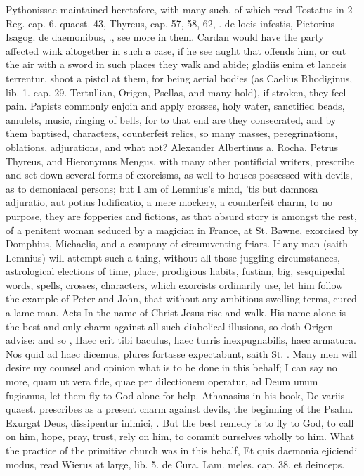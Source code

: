 {Pythonissae maintained heretofore, with many such, of which read
Tostatus in 2 Reg. cap. 6. quaest. 43, Thyreus, cap. 57, 58, 62, \etc{}. de
locis infestis, Pictorius Isagog. de daemonibus, \etc{}., see more in them.
Cardan would have the party affected wink altogether in such a case, if
he see aught that offends him, or cut the air with a sword in such
places they walk and abide; gladiis enim et lanceis terrentur, shoot a
pistol at them, for being aerial bodies (as Caelius Rhodiginus, lib. 1.
cap. 29. Tertullian, Origen, Psellas, and many hold), if stroken, they
feel pain. Papists commonly enjoin and apply crosses, holy water,
sanctified beads, amulets, music, ringing of bells, for to that end are
they consecrated, and by them baptised, characters, counterfeit relics,
so many masses, peregrinations, oblations, adjurations, and what not?
Alexander Albertinus a, Rocha, Petrus Thyreus, and Hieronymus Mengus,
with many other pontificial writers, prescribe and set down several
forms of exorcisms, as well to houses possessed with devils, as to
demoniacal persons; but I am of Lemnius's mind, 'tis but damnosa
adjuratio, aut potius ludificatio, a mere mockery, a counterfeit charm,
to no purpose, they are fopperies and fictions, as that absurd
story is amongst the rest, of a penitent woman seduced by a
magician in France, at St. Bawne, exorcised by Domphius, Michaelis, and
a company of circumventing friars. If any man (saith Lemnius) will
attempt such a thing, without all those juggling circumstances,
astrological elections of time, place, prodigious habits, fustian, big,
sesquipedal words, spells, crosses, characters, which exorcists
ordinarily use, let him follow the example of Peter and John, that
without any ambitious swelling terms, cured a lame man. Acts  In
the name of Christ Jesus rise and walk. His name alone is the best and
only charm against all such diabolical illusions, so doth Origen
advise: and so \Chrysostom{}, Haec erit tibi baculus, haec turris
inexpugnabilis, haec armatura. Nos quid ad haec dicemus, plures
fortasse expectabunt, saith St. \Austin{}. Many men will desire my counsel
and opinion what is to be done in this behalf; I can say no more, quam
ut vera fide, quae per dilectionem operatur, ad Deum unum fugiamus, let
them fly to God alone for help. Athanasius in his book, De variis
quaest. prescribes as a present charm against devils, the beginning of
the  Psalm. Exurgat Deus, dissipentur inimici, \etc{}. But the best
remedy is to fly to God, to call on him, hope, pray, trust, rely on
him, to commit ourselves wholly to him. What the practice of the
primitive church was in this behalf, Et quis daemonia ejiciendi modus,
read Wierus at large, lib. 5. de Cura. Lam. meles. cap. 38. et
deinceps.

}

